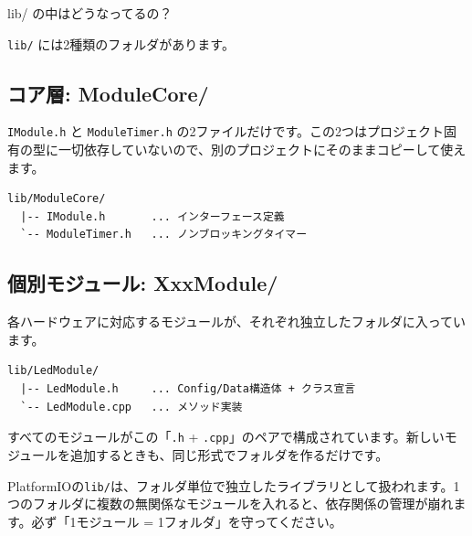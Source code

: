 \begin{qabox}{lib/ の中はどうなってるの？}

\texttt{lib/} には2種類のフォルダがあります。

\subsection{コア層: ModuleCore/}

\texttt{IModule.h} と \texttt{ModuleTimer.h} の2ファイルだけです。この2つはプロジェクト固有の型に一切依存していないので、別のプロジェクトにそのままコピーして使えます。

\begin{lstlisting}[language={},keywordstyle={},commentstyle={},stringstyle={},numbers=none,frame=none,backgroundcolor=\color{lightgray},xleftmargin=5pt,framexleftmargin=5pt]
lib/ModuleCore/
  |-- IModule.h       ... インターフェース定義
  `-- ModuleTimer.h   ... ノンブロッキングタイマー
\end{lstlisting}

\subsection{個別モジュール: XxxModule/}

各ハードウェアに対応するモジュールが、それぞれ独立したフォルダに入っています。

\begin{lstlisting}[language={},keywordstyle={},commentstyle={},stringstyle={},numbers=none,frame=none,backgroundcolor=\color{lightgray},xleftmargin=5pt,framexleftmargin=5pt]
lib/LedModule/
  |-- LedModule.h     ... Config/Data構造体 + クラス宣言
  `-- LedModule.cpp   ... メソッド実装
\end{lstlisting}

すべてのモジュールがこの「\texttt{.h} + \texttt{.cpp}」のペアで構成されています。新しいモジュールを追加するときも、同じ形式でフォルダを作るだけです。

\begin{cautionbox}[1モジュール = 1フォルダを守る]
PlatformIOの\texttt{lib/}は、フォルダ単位で独立したライブラリとして扱われます。1つのフォルダに複数の無関係なモジュールを入れると、依存関係の管理が崩れます。必ず「1モジュール = 1フォルダ」を守ってください。
\end{cautionbox}

\end{qabox}

